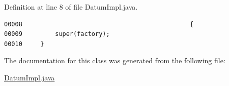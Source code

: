 Definition at line 8 of file Datum\-Impl.java.\footnotesize\begin{verbatim}00008                                              {
00009         super(factory);
00010     }
\end{verbatim}\normalsize 


The documentation for this class was generated from the following file:\begin{CompactItemize}
\item 
\hyperlink{DatumImpl_8java-source}{Datum\-Impl.java}\end{CompactItemize}
